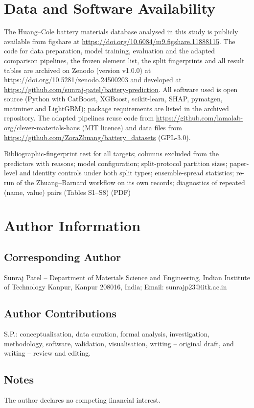\documentclass[journal=jcisd8,manuscript=article,layout=traditional]{achemso}
\begin{document}
\section{Data and Software Availability}
The Huang--Cole battery materials database analysed in this study is publicly available from figshare \cite{huang2020figshare} at \url{https://doi.org/10.6084/m9.figshare.11888115}. The code for data preparation, model training, evaluation and the adapted comparison pipelines, the frozen element list, the split fingerprints and all result tables are archived on Zenodo \cite{patel2026batteryprediction} (version v1.0.0) at \url{https://doi.org/10.5281/zenodo.24500203} and developed at \url{https://github.com/sunraj-patel/battery-prediction}. All software used is open source (Python with CatBoost, XGBoost, scikit-learn, SHAP, pymatgen, matminer and LightGBM); package requirements are listed in the archived repository. The adapted pipelines reuse code from \url{https://github.com/lamalab-org/clever-materials-hans} (MIT licence) and data files from \url{https://github.com/ZoraZhuang/battery_datasets} (GPL-3.0).

\begin{suppinfo}
Bibliographic-fingerprint test for all targets; columns excluded from the predictors with reasons; model configuration; split-protocol partition sizes; paper-level and identity controls under both split types; ensemble-spread statistics; re-run of the Zhuang--Barnard workflow on its own records; diagnostics of repeated (name, value) pairs (Tables S1--S8) (PDF)
\end{suppinfo}

\section*{Author Information}
\subsection*{Corresponding Author}
Sunraj Patel -- Department of Materials Science and Engineering, Indian Institute of Technology Kanpur, Kanpur 208016, India; Email: sunrajp23@iitk.ac.in
\subsection*{Author Contributions}
S.P.: conceptualisation, data curation, formal analysis, investigation, methodology, software, validation, visualisation, writing -- original draft, and writing -- review and editing.
\subsection*{Notes}
The author declares no competing financial interest.
\end{document}

